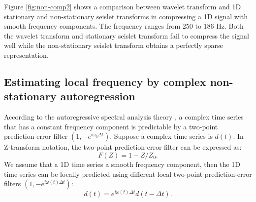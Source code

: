 Figure \ref{fig:non-comp2} shows a comparison between  wavelet transform and  1D stationary and non-stationary seislet transforms in compressing a 1D signal with smooth frequency components. The frequency ranges from 250 to 186 Hz. Both the wavelet transform and stationary seislet transform fail to compress the signal well while the non-stationary seislet transform obtains a perfectly sparse representation.



\subsection{Estimating local frequency by complex non-stationary autoregression}
According to the autoregressive spectral analysis theory \cite[]{marple}, a complex time series that has a constant frequency component is predictable by a two-point prediction-error filter $(1,-e^{i\omega_0\Delta t})$. Suppose a complex time series is $d(t)$. In Z-transform notation, the two-point prediction-error filter can be expressed as:
\begin{equation}
\label{eq:twopre}
F(Z)=1-Z/Z_0.
\end{equation} 
We assume that a 1D time series  a smooth frequency component, then the 1D time series can be locally predicted using different local two-point prediction-error filters $(1,-e^{i\omega(t)\Delta t})$:
\begin{equation}
\label{eq:localpre}
d(t)=e^{i\omega(t)\Delta t}d(t-\Delta t).
\end{equation}

